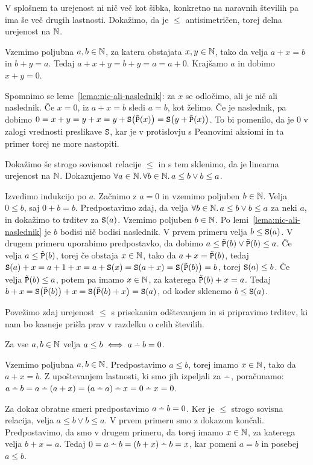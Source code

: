 V splošnem ta urejenost ni nič več kot šibka, konkretno na naravnih številih pa ima še več drugih lastnosti. Dokažimo, da je $\leq$ antisimetričen, torej delna urejenost na $\mathbb{N}$.

Vzemimo poljubna $a, b \in \mathbb{N}$, za katera obstajata $x, y \in \mathbb{N}$, tako da velja $a + x = b$ in $b + y = a$. Tedaj $a + x + y = b + y = a = a + 0$. Krajšamo $a$ in dobimo $x + y = 0$.

Spomnimo se leme~\ref{lema:nic-ali-naslednik}: za $x$ se odločimo, ali je nič ali naslednik. Če $x = 0$, iz $a + x = b$ sledi $a = b$, kot želimo. Če je naslednik, pa dobimo $0 = x + y = y + x = y + \mathtt{S}\big(\tilde{\mathtt{P}}(x)\big) = \mathtt{S}\big(y + \tilde{\mathtt{P}}(x)\big)$. To bi pomenilo, da je $0$ v zalogi vrednosti preslikave $\mathtt{S}$, kar je v protislovju s Peanovimi aksiomi in ta primer torej ne more nastopiti.

Dokažimo še strogo sovisnost relacije $\leq$ in s tem sklenimo, da je linearna urejenost na $\mathbb{N}$. Dokazujemo $\forall a \in \mathbb{N} .\,\forall b \in \mathbb{N} .\,{a \leq b \lor b \leq a}$.

Izvedimo indukcijo po $a$. Začnimo z $a = 0$ in vzemimo poljuben $b \in \mathbb{N}$. Velja $0 \leq b$, saj $0 + b = b$. Predpostavimo zdaj, da velja $\forall b \in \mathbb{N} .\,{a \leq b \lor b \leq a}$ za neki $a$, in dokažimo to trditev za $\mathtt{S}(a)$. Vzemimo poljuben $b \in \mathbb{N}$. Po lemi~\ref{lema:nic-ali-naslednik} je $b$ bodisi nič bodisi naslednik. V prvem primeru velja $b \leq \mathtt{S}(a)$. V drugem primeru uporabimo predpostavko, da dobimo $a \leq \tilde{\mathtt{P}}(b) \lor \tilde{\mathtt{P}}(b) \leq a$. Če velja $a \leq \tilde{\mathtt{P}}(b)$, torej če obstaja $x \in \mathbb{N}$, tako da $a + x = \tilde{\mathtt{P}}(b)$, tedaj $\mathtt{S}(a) + x = a + 1 + x = a + \mathtt{S}(x) = \mathtt{S}(a + x) = \mathtt{S}\big(\tilde{\mathtt{P}}(b)\big) = b$, torej $\mathtt{S}(a) \leq b$. Če velja $\tilde{\mathtt{P}}(b) \leq a$, potem pa imamo $x \in \mathbb{N}$, za katerega $\tilde{\mathtt{P}}(b) + x = a$. Tedaj $b + x = \mathtt{S}\big(\tilde{\mathtt{P}}(b)\big) + x = \mathtt{S}\big(\tilde{\mathtt{P}}(b) + x\big) = \mathtt{S}(a)$, od koder sklenemo $b \leq \mathtt{S}(a)$.

Povežimo zdaj urejenost $\leq$ s prisekanim odštevanjem in si pripravimo trditev, ki nam bo kasneje prišla prav v razdelku o celih številih.

\begin{trditev}
Za vse $a, b \in \mathbb{N}$ velja $a \leq b \iff a \monus b = 0$.
\end{trditev}

\begin{dokaz}
Vzemimo poljubna $a, b \in \mathbb{N}$. Predpostavimo $a \leq b$, torej imamo $x \in \mathbb{N}$, tako da $a + x = b$. Z upoštevanjem lastnosti, ki smo jih izpeljali za $\monus$, poračunamo: $a \monus b = a \monus (a + x) = (a \monus a) \monus x = 0 \monus x = 0$.

Za dokaz obratne smeri predpostavimo $a \monus b = 0$. Ker je $\leq$ strogo sovisna relacija, velja $a \leq b \lor b \leq a$. V prvem primeru smo z dokazom končali. Predpostavimo, da smo v drugem primeru, da torej imamo $x \in \mathbb{N}$, za katerega velja $b + x = a$. Tedaj $0 = a \monus b = (b + x) \monus b = x$, kar pomeni $a = b$ in posebej $a \leq b$.
\end{dokaz}

